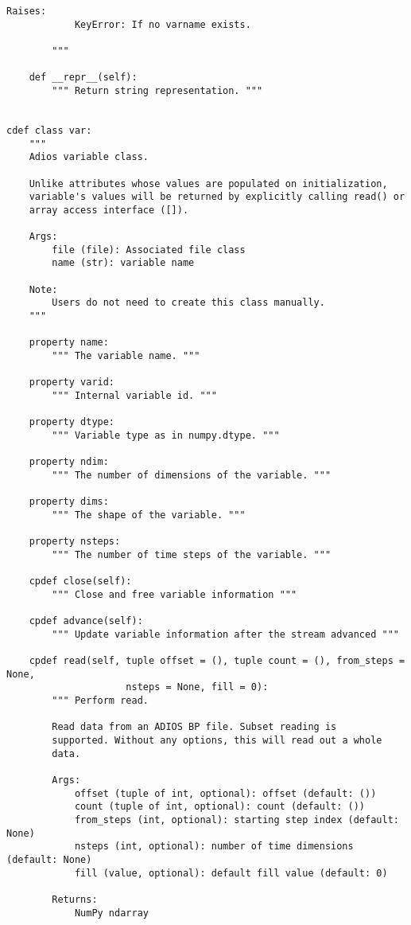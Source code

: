 \begin{lstlisting}[language=cython,caption={Read functions},label={},]
        Raises:
            KeyError: If no varname exists.

        """
        
    def __repr__(self):
        """ Return string representation. """


cdef class var:
    """
    Adios variable class.

    Unlike attributes whose values are populated on initialization,
    variable's values will be returned by explicitly calling read() or
    array access interface ([]).  

    Args:
        file (file): Associated file class
        name (str): variable name

    Note:
        Users do not need to create this class manually.
    """
    
    property name:
        """ The variable name. """
    
    property varid:
        """ Internal variable id. """
    
    property dtype:
        """ Variable type as in numpy.dtype. """

    property ndim:
        """ The number of dimensions of the variable. """

    property dims:
        """ The shape of the variable. """

    property nsteps:
        """ The number of time steps of the variable. """

    cpdef close(self):
        """ Close and free variable information """

    cpdef advance(self):
        """ Update variable information after the stream advanced """

    cpdef read(self, tuple offset = (), tuple count = (), from_steps = None, 
                     nsteps = None, fill = 0):
        """ Perform read.

        Read data from an ADIOS BP file. Subset reading is
        supported. Without any options, this will read out a whole
        data.

        Args:
            offset (tuple of int, optional): offset (default: ())
            count (tuple of int, optional): count (default: ())
            from_steps (int, optional): starting step index (default: None)
            nsteps (int, optional): number of time dimensions (default: None)
            fill (value, optional): default fill value (default: 0)

        Returns:
            NumPy ndarray
            

\end{lstlisting}
